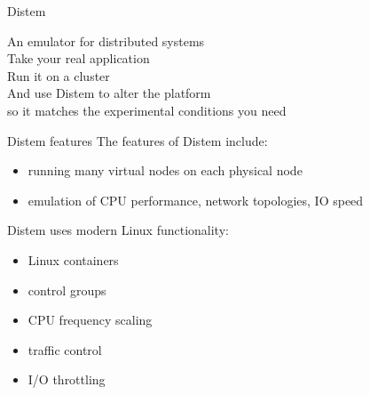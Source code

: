 \documentclass[11pt,xcolor=dvipsnames,presentation]{beamer}
\begin{document}
\begin{frame}[label=sec-2-0-1]{Distem}
\begin{center}
\huge
An emulator for distributed systems\\[0.5em]
\large
Take your \alert{real application}\\[0.5em]
Run it on a \alert{cluster}\\[0.5em]
And use \alert{Distem} to \alert{alter the platform}\\
so it \alert{matches the experimental conditions you need}\\[1em]
\normalsize
{}
\end{center}
\end{frame}



\begin{frame}[label=sec-2-0-2]{Distem features}
The features of Distem include:

\begin{itemize}
\item running many virtual nodes on each physical node
\item emulation of CPU performance, network topologies, IO speed
\end{itemize}

Distem uses modern Linux functionality:

\begin{itemize}
\item Linux containers
\item control groups
\item CPU frequency scaling
\item traffic control
\item I/O throttling
\end{itemize}
\end{frame}
\end{document}
